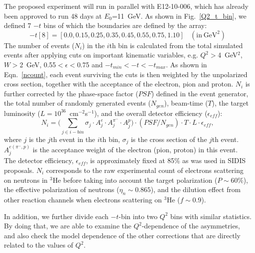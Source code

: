 The proposed experiment will run in parallel with E12-10-006, which has already
been approved to run 48 days at $E_{0}$=11~GeV.  As shown in
Fig.~\ref{Q2_t_bin}, we defined 7 $-t$ bins of which the boundaries are
defined by the array:
 \begin{equation}
   -t[8] = [0.0, 0.15, 0.25, 0.35, 0.45, 0.55, 0.75, 1.10]~~~~(\mathrm{in~GeV^{2}})
 \end{equation}
The number of events ($N_{i}$) in the $i$th bin is calculated from the total
simulated events after applying cuts on important kinematic variables,
e.g. $Q^{2}>$4~GeV$^{2}$, $W>$2~GeV, 0.55$<\epsilon<$0.75 and
$-t_{min}<-t<-t_{max}$. As shown in Eqn.~\ref{ncount}, each event surviving the
cuts is then weighted by the unpolarized cross section, together with the
acceptance of the electron, pion and proton. $N_{i}$ is further corrected by
the phase-space factor ($PSF$) defined in the event generator, the total number
of randomly generated events ($N_{gen}$), beam-time ($T$), the target
luminosity ($L=10^{36}$~cm$^{-2}$s$^{-1}$), and the overall detector efficiency 
($\epsilon_{eff}$):
 \begin{equation}
     N_{i} = \bigl(\sum_{j\in i-bin} \sigma_{j}\cdot A^{e}_{j} \cdot
     A^{\pi^{-}}_{j} \cdot A^{p}_{j}\bigr) \cdot (PSF/N_{gen}) \cdot T \cdot L \cdot
     \epsilon_{eff},
     \label{ncount}
 \end{equation}
where $j$ is the $j$th event in the $i$th bin, $\sigma_{j}$ is the cross
section of the $j$th event. $A^{e(\pi^{-},p)}_{j}$ is the acceptance weight of the
electron (pion, proton) in this event. The detector efficiency,
$\epsilon_{eff}$, is approximately fixed at 85\% as was used in SIDIS
proposals. $N_{i}$ corresponds to the raw experimental count of electrons
scattering on neutrons in $\mathrm{^{3}He}$ before taking into account the
target polarization ($P\sim60\%$), the effective polarization of neutrons
($\eta_{n}\sim0.865$), and the dilution effect from other reaction channels
when electrons scattering on $\mathrm{^{3}He}$ ($f \sim 0.9$). 

In addition, we further divide each $-t$-bin into two $Q^{2}$ bins with similar
statistics.  By doing that, we are able to examine the $Q^{2}$-dependence of the
asymmetries, and also check the model dependence of the other corrections that
are directly related to the values of $Q^{2}$.

